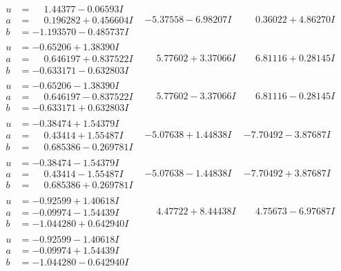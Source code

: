 \documentclass[1p]{elsarticle_modified}
\theoremstyle{definition}
\begin{document}
$$\begin{array}{c|c|c}
\begin{aligned}
u &= \phantom{-}1.44377 - 0.06593 I \\
a &= \phantom{-}0.196282 + 0.456604 I \\
b &= -1.193570 - 0.485737 I\end{aligned}
 & -5.37558 - 6.98207 I & \phantom{-}0.36022 + 4.86270 I \\ \hline\begin{aligned}
u &= -0.65206 + 1.38390 I \\
a &= \phantom{-}0.646197 + 0.837522 I \\
b &= -0.633171 - 0.632803 I\end{aligned}
 & \phantom{-}5.77602 + 3.37066 I & \phantom{-}6.81116 + 0.28145 I \\ \hline\begin{aligned}
u &= -0.65206 - 1.38390 I \\
a &= \phantom{-}0.646197 - 0.837522 I \\
b &= -0.633171 + 0.632803 I\end{aligned}
 & \phantom{-}5.77602 - 3.37066 I & \phantom{-}6.81116 - 0.28145 I \\ \hline\begin{aligned}
u &= -0.38474 + 1.54379 I \\
a &= \phantom{-}0.43414 + 1.55487 I \\
b &= \phantom{-}0.685386 - 0.269781 I\end{aligned}
 & -5.07638 + 1.44838 I & -7.70492 - 3.87687 I \\ \hline\begin{aligned}
u &= -0.38474 - 1.54379 I \\
a &= \phantom{-}0.43414 - 1.55487 I \\
b &= \phantom{-}0.685386 + 0.269781 I\end{aligned}
 & -5.07638 - 1.44838 I & -7.70492 + 3.87687 I \\ \hline\begin{aligned}
u &= -0.92599 + 1.40618 I \\
a &= -0.09974 - 1.54439 I \\
b &= -1.044280 + 0.642940 I\end{aligned}
 & \phantom{-}4.47722 + 8.44438 I & \phantom{-}4.75673 - 6.97687 I \\ \hline\begin{aligned}
u &= -0.92599 - 1.40618 I \\
a &= -0.09974 + 1.54439 I \\
b &= -1.044280 - 0.642940 I\end{aligned}

\end{array}$$
\end{document}
